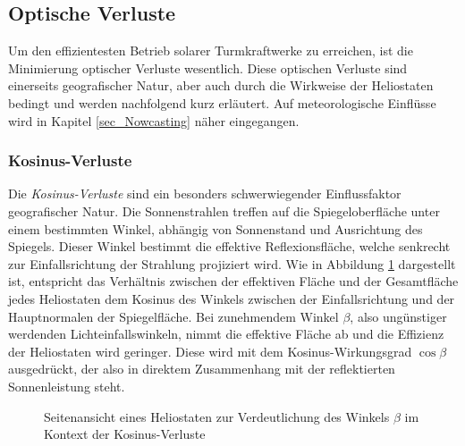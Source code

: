 \subsection{Optische Verluste} \label{subsec_OptischeVerluste}
Um den effizientesten Betrieb solarer Turmkraftwerke zu erreichen, ist die Minimierung optischer Verluste wesentlich.
Diese optischen Verluste sind einerseits geografischer Natur, aber auch durch die Wirkweise der Heliostaten bedingt und werden nachfolgend kurz erläutert.
Auf meteorologische Einflüsse wird in Kapitel \ref{sec_Nowcasting} näher eingegangen.

\subsubsection*{Kosinus-Verluste} \label{subsubsec_KosinusVerluste}
Die \textit{Kosinus-Verluste} sind ein besonders schwerwiegender Einflussfaktor geografischer Natur.
Die Sonnenstrahlen treffen auf die Spiegeloberfläche unter einem bestimmten Winkel, abhängig von Sonnenstand und Ausrichtung des Spiegels.
Dieser Winkel bestimmt die effektive Reflexionsfläche, welche senkrecht zur Einfallsrichtung der Strahlung projiziert wird.
Wie in Abbildung \ref{fig_KosinusVerlust} dargestellt ist, entspricht das Verhältnis zwischen der effektiven Fläche und der Gesamtfläche jedes Heliostaten dem Kosinus des Winkels zwischen der Einfallsrichtung und der Hauptnormalen der Spiegelfläche.
Bei zunehmendem Winkel $\beta$, also ungünstiger werdenden Lichteinfallswinkeln, nimmt die effektive Fläche ab und die Effizienz der Heliostaten wird geringer.
Diese wird mit dem Kosinus-Wirkungsgrad $\cos\beta$ ausgedrückt, der also in direktem Zusammenhang mit der reflektierten Sonnenleistung steht.

\begin{figure}[h!]
    \centering
    \setlength{\fboxsep}{1pt}
    \setlength{\fboxrule}{1pt}
\caption[Seitenansicht eines Heliostaten zur Verdeutlichung des Winkels $\beta$ im Kontext der Kosinus-Verluste]{Seitenansicht eines Heliostaten zur Verdeutlichung des Winkels $\beta$ im Kontext der Kosinus-Verluste \cite[S.7]{DissZanger}}
    \label{fig_KosinusVerlust}
\end{figure}

